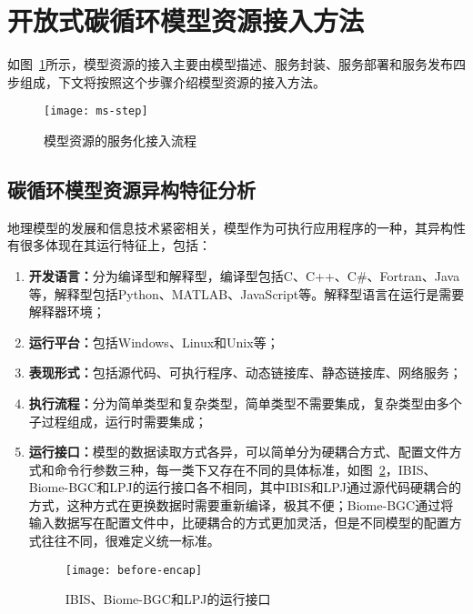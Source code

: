 

\section{开放式碳循环模型资源接入方法}
\label{sec:model-joinup}
如图~\ref{fig:ms-step}所示，模型资源的接入主要由模型描述、服务封装、服务部署和服务发布四步组成，下文将按照这个步骤介绍模型资源的接入方法。

\begin{figure}[!htbp]
    \centering
    \texttt{[image: ms-step]}
    \caption{模型资源的服务化接入流程}
    \label{fig:ms-step}
\end{figure}

\subsection{碳循环模型资源异构特征分析}

地理模型的发展和信息技术紧密相关，模型作为可执行应用程序的一种，其异构性有很多体现在其运行特征上，包括：
\begin{enumerate}[(1)]
    \item \textbf{开发语言：}分为编译型和解释型，编译型包括C、C++、C\#、Fortran、Java等，解释型包括Python、MATLAB、JavaScript等。解释型语言在运行是需要解释器环境；
    \item \textbf{运行平台：}包括Windows、Linux和Unix等；
    \item \textbf{表现形式：}包括源代码、可执行程序、动态链接库、静态链接库、网络服务；
    \item \textbf{执行流程：}分为简单类型和复杂类型，简单类型不需要集成，复杂类型由多个子过程组成，运行时需要集成；
    \item \textbf{运行接口：}模型的数据读取方式各异，可以简单分为硬耦合方式、配置文件方式和命令行参数三种，每一类下又存在不同的具体标准，如图~\ref{fig:before-encap}，IBIS、Biome-BGC和LPJ的运行接口各不相同，其中IBIS和LPJ通过源代码硬耦合的方式，这种方式在更换数据时需要重新编译，极其不便；Biome-BGC通过将输入数据写在配置文件中，比硬耦合的方式更加灵活，但是不同模型的配置方式往往不同，很难定义统一标准。
    \begin{figure}[!htbp]
        \centering
        \texttt{[image: before-encap]}
        \caption{IBIS、Biome-BGC和LPJ的运行接口}
        \label{fig:before-encap}
    \end{figure}
\end{enumerate}

